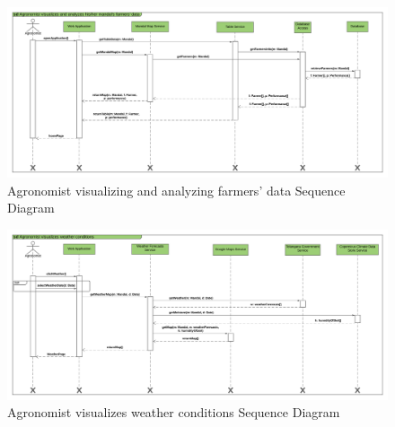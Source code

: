 \newpage
\begin{landscape}
\begin{figure}[h]
\vspace*{-2cm}
\noindent
\centering
\centerline{\includegraphics[scale= 0.108]{./Images/Agronomist visualizes and analyzes his_her mandal's farmers' data.png}}
    \caption{Agronomist visualizing and analyzing farmers' data Sequence Diagram}
    \vspace*{-12cm}
\end{figure}
\fillandplacepagenumber
\end{landscape}

\newpage
\begin{landscape}
\begin{figure}[h]
\vspace*{-2cm}
\noindent
\centering
\centerline{\includegraphics[scale= 0.108]{./Images/Agronomist visualizes weather conditions.png}}
    \caption{Agronomist visualizes weather conditions Sequence Diagram}
    \vspace*{-12cm}
\end{figure}
\fillandplacepagenumber
\end{landscape}

